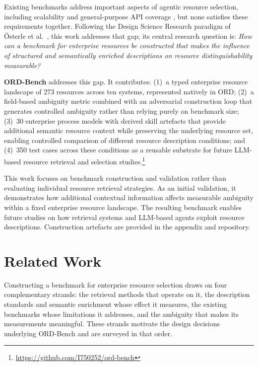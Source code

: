 \documentclass[10pt,twocolumn]{article}
\begin{document}
Existing benchmarks address important aspects of agentic resource selection, including scalability and general-purpose API coverage \citep{gonzalez_gorilla_2024,qin_toolllm_nodate,shi_retrieval_2025,lu_toolsandbox_2025}, but none satisfies these requirements together. Following the Design Science Research paradigm of Österle et al.\ \citep{osterle2010}, this work addresses that gap; its central research question is: \textit{How can a benchmark for enterprise resources be constructed that makes the influence of structured and semantically enriched descriptions on resource distinguishability measurable?}

\textbf{ORD-Bench} addresses this gap. It contributes: (1)~a typed enterprise resource landscape of 273 resources across ten systems, represented natively in ORD; (2)~a field-based ambiguity metric combined with an adversarial construction loop that generates controlled ambiguity rather than relying purely on benchmark size; (3)~30 enterprise process models with derived skill artefacts that provide additional semantic resource context while preserving the underlying resource set, enabling controlled comparison of different resource description conditions; and (4)~350 test cases across these conditions as a reusable substrate for future LLM-based resource retrieval and selection studies.\footnote{\url{https://github.com/I750252/ord-bench}}

This work focuses on benchmark construction and validation rather than evaluating individual resource retrieval strategies. As an initial validation, it demonstrates how additional contextual information affects measurable ambiguity within a fixed enterprise resource landscape. The resulting benchmark enables future studies on how retrieval systems and LLM-based agents exploit resource descriptions. Construction artefacts are provided in the appendix and repository.



\section{Related Work}
\label{sec:related}

Constructing a benchmark for enterprise resource selection draws on four complementary strands: the retrieval methods that operate on it, the description standards and semantic enrichment whose effect it measures, the existing benchmarks whose limitations it addresses, and the ambiguity that makes its measurements meaningful. These strands motivate the design decisions underlying ORD-Bench and are surveyed in that order.
\end{document}
